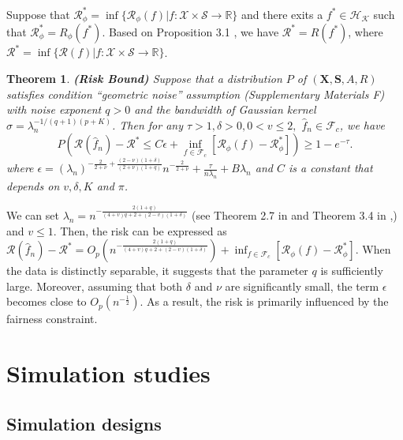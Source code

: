 \documentclass[12pt]{article}
\theoremstyle{plain}
\newtheorem{theorem}{Theorem}[section]
\theoremstyle{definition}
\theoremstyle{remark}
\begin{document}
Suppose that $\mathcal{R}_{\phi}^{*}= \inf  \{\mathcal{R}_{\phi}(f)| f: \mathcal{X}\times\mathcal{S}\rightarrow \mathbb{R} \}$ and there exits a $f^{*}\in \mathcal{H}_{\mathcal{K}}$ such that $\mathcal{R}_{\phi}^{*}=R_{\phi}(f^{*})$. Based on Proposition 3.1  \citep{zhao2012estimating}, we have $\mathcal{R}^{*}=R(f^{*})$, where $\mathcal{R}^{*}= \inf  \{\mathcal{R}(f)| f: \mathcal{X}\times\mathcal{S}\rightarrow \mathbb{R} \}$.
\begin{theorem} \textbf{\upshape (Risk Bound)} Suppose that a distribution $P$ of $(\boldsymbol{X}, \boldsymbol{S}, A, R)$ satisfies condition ``geometric noise'' assumption (Supplementary Materials F) with noise exponent $q>0$ \citep{steinwart2007fast,zhao2012estimating} and  the bandwidth of Gaussian kernel $\sigma=\lambda_n^{-1 /(q+1)(p+K)} $. Then for any $\tau>1, \delta>0,0<v\leq2,$ $
\widehat{f}_n\in\mathcal{F}_c$,  we have
$$
P\left(\mathcal{R}(\widehat{f}_n)-\mathcal{R}^{*} \leq
C\epsilon +\inf _{f \in \mathcal{F}_{c}}\left[\mathcal{R}_\phi(f)-\mathcal{R}_\phi^{*}\right]\right)\geq 1-e^{-\tau}.
$$
where $\epsilon=\left(\lambda_n\right)^{-\frac{2}{2+\nu}+\frac{(2-\nu)(1+\delta)}{(2+\nu)(1+q)}} n^{-\frac{2}{2+\nu}}+\frac{\tau}{n \lambda_n}+B\lambda_n$ and $C$ is a constant that depends on $v,\delta, K$ and $\pi$.
\end{theorem}
 We can set $\lambda_n=n^{-\frac{2(1+q)}{(4+v) q+2+(2-v)(1+\delta)}}$ (see Theorem 2.7 in \cite{steinwart2007fast} and Theorem 3.4 in \cite{zhao2012estimating},) and $v\leq 1$.  Then, the risk can be expressed as
$\mathcal{R}(\widehat{f}_n)-\mathcal{R}^{*}=O_{p}(n^{-\frac{2(1+q)}{(4+v) q+2+(2-v)(1+\delta)}})+\inf _{f \in \mathcal{F}_{c}}\left[\mathcal{R}_\phi(f)-\mathcal{R}_\phi^{*}\right]$.
When the data is distinctly separable, it suggests that the parameter $q$ is sufficiently large. Moreover, assuming that both $\delta$ and $\nu$ are significantly small, the term $\epsilon$ becomes close to $O_p(n^{-\frac{1}{2}})$. As a result, the risk is primarily influenced by the fairness constraint.



\section{Simulation studies}

\subsection{Simulation designs}
\end{document}
